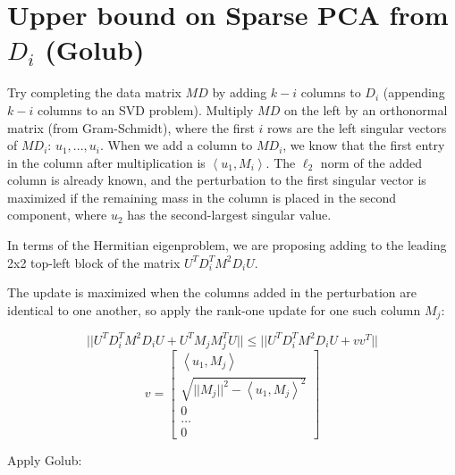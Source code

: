 \documentclass{article}
\begin{document}
\section{Upper bound on Sparse PCA from $D_i$ (Golub)}

Try completing the data matrix $MD$ by adding $k-i$ columns to $D_i$ (appending $k-i$ columns to an SVD problem). Multiply $MD$ on the left by an orthonormal matrix (from Gram-Schmidt), where the first $i$ rows are the left singular vectors of $MD_i$: $u_1,...,u_i$. When we add a column to $MD_i$, we know that the first entry in the column after multiplication is $\left< u_1, M_i \right>$. The $\ell_2$ norm of the added column is already known, and the perturbation to the first singular vector is maximized if the remaining mass in the column is placed in the second component, where $u_2$ has the second-largest singular value.

In terms of the Hermitian eigenproblem, we are proposing adding to the leading 2x2 top-left block of the matrix $U^T D_i^T M^2 D_i U$.

The update is maximized when the columns added in the perturbation are identical to one another, so apply the rank-one update for one such column $M_j$:

$$
|| U^T D_i^T M^2 D_i U + U^T M_j M_j^T U ||
\le || U^T D_i^T M^2 D_i U + vv^T ||
$$$$
v = \left[\begin{matrix}
    \left< u_1, M_j \right>
    \\
    \sqrt{
        ||M_j||^2
        - \left< u_1, M_j \right>
        ^2
    }
    \\ 0
    \\ \dots
    \\ 0
\end{matrix}\right]
$$

Apply Golub:
\end{document}
